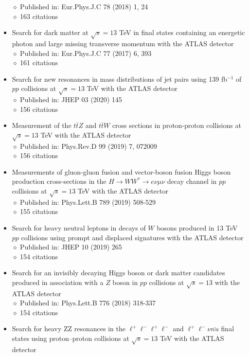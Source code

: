 \documentclass[margin, 10pt]{res} %
\begin{document}
\begin{resume}
\begin{itemize}
$\diamond$ Published in: Eur.Phys.J.C 78 (2018) 1, 24\\
$\diamond$ 163 citations
\item Search for dark matter at $\sqrt{s} = 13$ TeV in final states containing an energetic photon and large missing transverse momentum with the ATLAS detector\\
$\diamond$ Published in: Eur.Phys.J.C 77 (2017) 6, 393\\
$\diamond$ 161 citations
\item Search for new resonances in mass distributions of jet pairs using 139 fb$^{-1}$ of $pp$ collisions at $\sqrt{s} = 13$ TeV with the ATLAS detector\\
$\diamond$ Published in: JHEP 03 (2020) 145\\
$\diamond$ 156 citations
\item Measurement of the $t\bar{t}Z$ and $t\bar{t}W$ cross sections in proton-proton collisions at $\sqrt{s} = 13$ TeV with the ATLAS detector\\
$\diamond$ Published in: Phys.Rev.D 99 (2019) 7, 072009\\
$\diamond$ 156 citations
\item Measurements of gluon-gluon fusion and vector-boson fusion Higgs boson production cross-sections in the $H \rightarrow WW^{*} \rightarrow e\nu\mu\nu$ decay channel in $pp$ collisions at $\sqrt{s} = 13$ TeV with the ATLAS detector\\
$\diamond$ Published in: Phys.Lett.B 789 (2019) 508-529\\
$\diamond$ 155 citations
\item Search for heavy neutral leptons in decays of $W$ bosons produced in 13 TeV $pp$ collisions using prompt and displaced signatures with the ATLAS detector\\
$\diamond$ Published in: JHEP 10 (2019) 265\\
$\diamond$ 154 citations
\item Search for an invisibly decaying Higgs boson or dark matter candidates produced in association with a $Z$ boson in $pp$ collisions at $\sqrt{s} = 13$ with the ATLAS detector\\
$\diamond$ Published in: Phys.Lett.B 776 (2018) 318-337\\
$\diamond$ 154 citations
\item Search for heavy ZZ resonances in the $\ell^{+}\ell^{-}\ell^{+}\ell^{-}$ and $\ell^{+}\ell^{-}\nu\bar{nu}$ final states using proton–proton collisions at $\sqrt{s} = 13$ TeV with the ATLAS detector\\

\end{itemize}
\end{resume}
\end{document}
